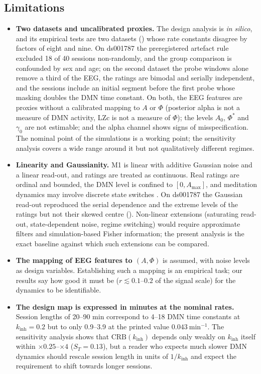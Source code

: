 \documentclass[12pt,a4paper]{article}
\theoremstyle{plain}
\theoremstyle{definition}
\theoremstyle{remark}
\newcommand{\kinh}{k_{\mathrm{inh}}}
\newcommand{\Amax}{A_{\max}}
\newcommand{\CRB}{\mathrm{CRB}}
\begin{document}
\subsection{Limitations}
\label{sec:limitations}

\begin{itemize}
  \item \textbf{Two datasets and uncalibrated proxies.} The design analysis is \emph{in silico}, and its empirical tests are two datasets () whose rate constants disagree by factors of eight and nine. On ds001787 the preregistered artefact rule excluded 18 of 40 sessions non-randomly, and the group comparison is confounded by sex and age; on the second dataset the probe windows alone remove a third of the EEG, the ratings are bimodal and serially independent, and the sessions include an initial segment before the first probe whose masking doubles the DMN time constant. On both, the EEG features are proxies without a calibrated mapping to $A$ or $\Phi$ (posterior alpha is not a measure of DMN activity, LZc is not a measure of $\Phi$); the levels $A_0$, $\Phi^*$ and $\gamma_0$ are not estimable; and the alpha channel shows signs of misspecification. The nominal point of the simulations is a working point; the sensitivity analysis covers a wide range around it but not qualitatively different regimes.
  \item \textbf{Linearity and Gaussianity.} M1 is linear with additive Gaussian noise and a linear read-out, and ratings are treated as continuous. Real ratings are ordinal and bounded, the DMN level is confined to $[0,\Amax]$, and meditation dynamics may involve discrete state switches \citep{Hasenkamp2012,Christoff2016}. On ds001787 the Gaussian read-out reproduced the serial dependence and the extreme levels of the ratings but not their skewed centre (). Non-linear extensions (saturating read-out, state-dependent noise, regime switching) would require approximate filters and simulation-based Fisher information; the present analysis is the exact baseline against which such extensions can be compared.
  \item \textbf{The mapping of EEG features to $(A,\Phi)$} is assumed, with noise levels as design variables. Establishing such a mapping is an empirical task; our results say how good it must be ($r\lesssim0.1$--$0.2$ of the signal scale) for the dynamics to be identifiable.
  \item \textbf{The design map is expressed in minutes at the nominal rates.} Session lengths of 20--90 min correspond to 4--18 DMN time constants at $\kinh=0.2$ but to only 0.9--3.9 at the printed value $0.043\ \mathrm{min^{-1}}$. The sensitivity analysis shows that $\CRB(\kinh)$ depends only weakly on $\kinh$ itself within $\times0.25$--$\times4$ ($S_T=0.13$), but a reader who expects much slower DMN dynamics should rescale session length in units of $1/\kinh$ and expect the requirement to shift towards longer sessions.

\end{itemize}
\end{document}
